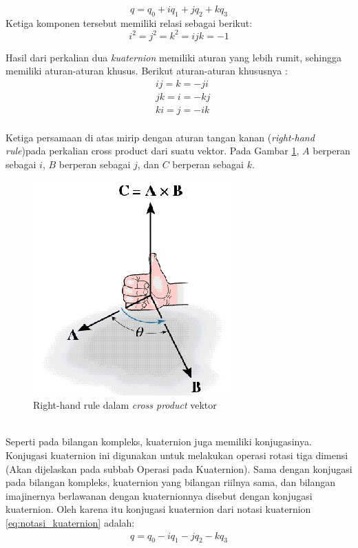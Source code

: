 \begin{equation}
	q = q_0 + i q_1 + j q_2 + k q_3	
\label{eq:notasi_kuaternion}
\end{equation}
Ketiga komponen tersebut memiliki relasi sebagai berikut:
\[
	i^2 = j^2 = k^2 = ijk = -1
\]

Hasil dari perkalian dua \textit{kuaternion} memiliki aturan yang lebih rumit, sehingga memiliki aturan-aturan khusus. Berikut aturan-aturan khususnya :
\begin{equation}
	\begin{split}
	& ij = k = -ji\\
	& jk = i = -kj\\
	& ki = j = -ik	
	\end{split}
\label{eq:persamaan_khusus_aturan_quaternion}
\end{equation}\\
Ketiga persamaan di atas mirip dengan aturan tangan kanan (\textit{right-hand rule})pada perkalian cross product dari suatu vektor. Pada Gambar \ref{fig:right-hand-rule}, \(A\) berperan sebagai \(i\), \(B\) berperan sebagai \(j\), dan \(C\) berperan sebagai \(k\).\\
\begin{figure}[htbp]
\centering
\includegraphics[scale=1]{Gambar/right-hand-rule}
\caption{Right-hand rule dalam \textit{cross product} vektor} 
\label{fig:right-hand-rule}
\end{figure}\\

Seperti pada bilangan kompleks, kuaternion juga memiliki konjugasinya. Konjugasi kuaternion ini digunakan untuk melakukan operasi rotasi tiga dimensi (Akan dijelaskan pada subbab Operasi pada Kuaternion). Sama dengan konjugasi pada bilangan kompleks, kuaternion yang bilangan riilnya sama, dan bilangan imajinernya berlawanan dengan kuaternionnya disebut dengan konjugasi kuaternion. Oleh karena itu konjugasi kuaternion dari notasi kuaternion \ref{eq:notasi_kuaternion} adalah: 
\begin{equation}
	\begin{split}
	q = q_0 - i q_1 - j q_2 - k q_3
	\end{split}
\end{equation}
